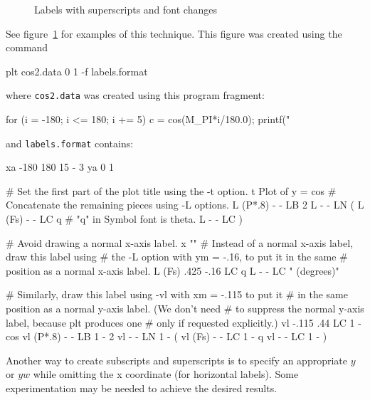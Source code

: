 \documentclass{book}
\begin{document}
\begin{figure}
\begin{center}
\end{center}
%
\caption{Labels with superscripts and font changes \label{fig:labels}}
\end{figure}

See figure~\ref{fig:labels} for examples of this technique.  This
figure was created using the command
\begin{center}
\begin{boxedverbatim}
plt cos2.data 0 1 -f labels.format
\end{boxedverbatim}
\end{center}
where {\tt cos2.data} was created using this program fragment:
\begin{center}
\begin{boxedverbatim}
for (i = -180; i <= 180; i += 5) {
    c = cos(M_PI*i/180.0);
    printf("%
}
\end{boxedverbatim}
\end{center}
and {\tt labels.format} contains:
\begin{center}
\begin{boxedverbatim}
xa -180 180 15 - 3
ya 0 1

# Set the first part of the plot title using the -t option.
t Plot of y = cos
# Concatenate the remaining pieces using -L options.
L (P*.8) - - LB 2
L - - LN (
L (Fs) - - LC q
# "q" in Symbol font is theta.
L - - LC )

# Avoid drawing a normal x-axis label.
x ""
# Instead of a normal x-axis label, draw this label using
# the -L option with ym = -.16, to put it in the same
# position as a normal x-axis label.
L (Fs) .425 -.16 LC q
L - - LC " (degrees)"

# Similarly, draw this label using -vl with xm = -.115 to put it
# in the same position as a normal y-axis label.  (We don't need
# to suppress the normal y-axis label, because plt produces one
# only if requested explicitly.)
vl -.115 .44 LC 1 -
cos
vl (P*.8) - - LB 1 -
2
vl - - LN 1 -
(
vl (Fs) - - LC 1 -
q
vl - - LC 1 -
)
\end{boxedverbatim}
\end{center}

%
%
Another way to create subscripts and superscripts is to specify an
appropriate $y$ or $yw$ while omitting the x coordinate (for
horizontal labels).  Some experimentation may be needed to achieve the
desired results.
\end{document}
